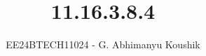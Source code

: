 \documentclass[journal]{IEEEtran}
\begin{document}

\vspace{3cm}

\title{11.16.3.8.4}
\author{EE24BTECH11024 - G. Abhimanyu Koushik}
 \maketitle
{\let\newpage\relax\maketitle}

\renewcommand{\thefigure}{\theenumi}
\renewcommand{\thetable}{\theenumi}
\setlength{\intextsep}{10pt} %


\renewcommand{\thetable}{\theenumi}
\end{document}
